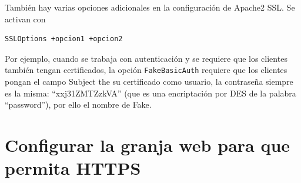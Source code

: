 \documentclass{article}
\begin{document}
También hay varias opciones adicionales en la configuración de Apache2 SSL. Se activan con
\begin{Verbatim}[tabsize=4]
SSLOptions +opcion1 +opcion2
\end{Verbatim}

Por ejemplo, cuando se trabaja con autenticación y se requiere que los clientes también tengan certificados, la opción
\texttt{FakeBasicAuth} requiere que los clientes pongan el campo Subject the su certificado como usuario, la contraseña siempre
es la misma: ``xxj31ZMTZzkVA'' (que es una encriptación por DES de la palabra ``password''), por ello el nombre de Fake.

\section{Configurar la granja web para que permita HTTPS}
\end{document}
